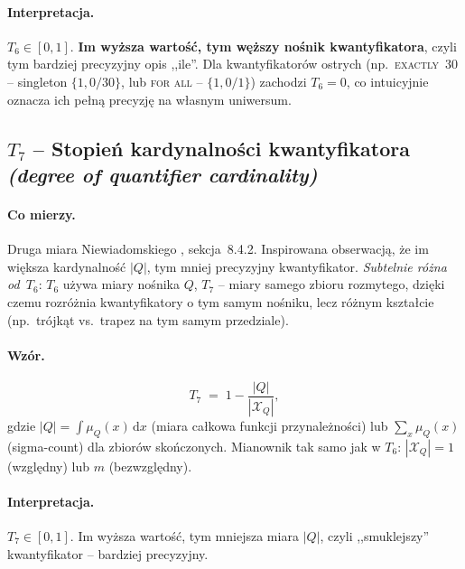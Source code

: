 \paragraph{Interpretacja.}
$T_6 \in [0, 1]$. \textbf{Im wyższa wartość, tym węższy nośnik
kwantyfikatora}, czyli tym bardziej precyzyjny opis ,,ile''. Dla
kwantyfikatorów ostrych (np.~\textsc{exactly~30} -- singleton
$\{1{,}0/30\}$, lub \textsc{for all} -- $\{1{,}0/1\}$) zachodzi
$T_6 = 0$, co intuicyjnie oznacza ich pełną precyzję na własnym
uniwersum.

\subsection*{$T_7$ -- Stopień kardynalności kwantyfikatora \\
\textit{(degree of quantifier cardinality)}}

\paragraph{Co mierzy.}
Druga miara Niewiadomskiego \cite{niewiadomski2008}, sekcja~8.4.2.
Inspirowana obserwacją, że im większa kardynalność $|Q|$, tym mniej
precyzyjny kwantyfikator. \emph{Subtelnie różna od~$T_6$}: $T_6$ używa
miary nośnika $Q$, $T_7$ -- miary samego zbioru rozmytego, dzięki
czemu rozróżnia kwantyfikatory o tym samym nośniku, lecz różnym
kształcie (np.~trójkąt vs.~trapez na tym samym przedziale).

\paragraph{Wzór.}
\begin{equation}
\label{eq:T7}
    T_7 \;=\; 1 - \frac{|Q|}{|\mathcal{X}_Q|},
\end{equation}
gdzie $|Q| = \int \mu_Q(x)\,\mathrm{d}x$ (miara całkowa funkcji
przynależności) lub $\sum_x \mu_Q(x)$ (sigma-count) dla zbiorów
skończonych. Mianownik tak samo jak w $T_6$:
$|\mathcal{X}_Q| = 1$ (względny) lub $m$ (bezwzględny).

\paragraph{Interpretacja.}
$T_7 \in [0, 1]$. Im wyższa wartość, tym mniejsza miara $|Q|$, czyli
,,smuklejszy'' kwantyfikator -- bardziej precyzyjny.


